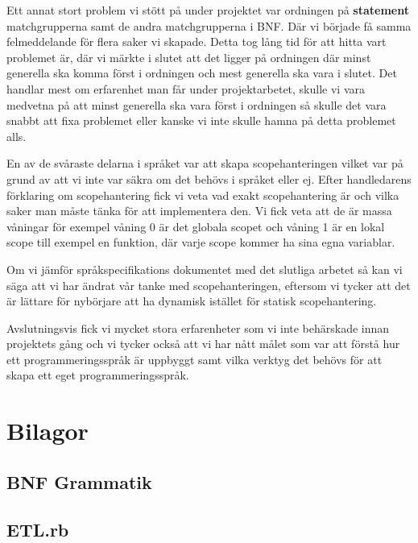 \documentclass{TDP019mall}
\begin{document}
Ett annat stort problem vi stött på under projektet var ordningen på \textbf{statement} matchgrupperna samt de andra matchgrupperna i BNF. Där vi började få samma
 felmeddelande för flera saker vi skapade. Detta tog lång tid för att hitta vart problemet är, där vi märkte i slutet att det ligger på ordningen där minst 
 generella ska komma först i ordningen och mest generella ska vara i slutet. Det handlar mest om erfarenhet man får under projektarbetet, skulle vi vara medvetna 
 på att minst generella ska vara först i ordningen så skulle det vara snabbt att fixa problemet eller kanske vi inte skulle hamna på detta problemet alls. 


En av de svåraste delarna i språket var att skapa scopehanteringen vilket var på grund av att vi inte var säkra om det behövs i språket eller ej. Efter handledarens 
förklaring om scopehantering fick vi veta vad exakt scopehantering är och vilka saker man måste tänka för att implementera den. Vi fick veta att de är massa våningar 
för exempel våning 0 är det globala scopet och våning 1 är en lokal scope till exempel en funktion, där varje scope kommer ha sina egna variablar. 


Om vi jämför språkspecifikations dokumentet med det slutliga arbetet så kan vi säga att vi har ändrat vår tanke med scopehanteringen, eftersom vi tycker att det 
är lättare för nybörjare att ha dynamisk istället för statisk scopehantering. 


Avslutningsvis fick vi mycket stora erfarenheter som vi inte behärskade innan projektets gång och vi tycker också att vi har nått målet som var att förstå 
hur ett programmeringsspråk är uppbyggt samt vilka verktyg det behövs för att skapa ett eget programmeringsspråk. 


        
\newpage
\section{Bilagor}

\subsection{BNF Grammatik}


\newpage
\subsection{ETL.rb}

\end{document}
